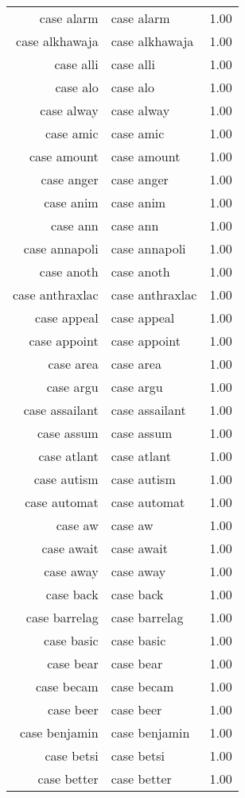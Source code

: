 \begin{table}[ht]
\begin{tabular}{rlr}
  case alarm & case alarm & 1.00 \\ 
  case alkhawaja & case alkhawaja & 1.00 \\ 
  case alli & case alli & 1.00 \\ 
  case alo & case alo & 1.00 \\ 
  case alway & case alway & 1.00 \\ 
  case amic & case amic & 1.00 \\ 
  case amount & case amount & 1.00 \\ 
  case anger & case anger & 1.00 \\ 
  case anim & case anim & 1.00 \\ 
  case ann & case ann & 1.00 \\ 
  case annapoli & case annapoli & 1.00 \\ 
  case anoth & case anoth & 1.00 \\ 
  case anthraxlac & case anthraxlac & 1.00 \\ 
  case appeal & case appeal & 1.00 \\ 
  case appoint & case appoint & 1.00 \\ 
  case area & case area & 1.00 \\ 
  case argu & case argu & 1.00 \\ 
  case assailant & case assailant & 1.00 \\ 
  case assum & case assum & 1.00 \\ 
  case atlant & case atlant & 1.00 \\ 
  case autism & case autism & 1.00 \\ 
  case automat & case automat & 1.00 \\ 
  case aw & case aw & 1.00 \\ 
  case await & case await & 1.00 \\ 
  case away & case away & 1.00 \\ 
  case back & case back & 1.00 \\ 
  case barrelag & case barrelag & 1.00 \\ 
  case basic & case basic & 1.00 \\ 
  case bear & case bear & 1.00 \\ 
  case becam & case becam & 1.00 \\ 
  case beer & case beer & 1.00 \\ 
  case benjamin & case benjamin & 1.00 \\ 
  case betsi & case betsi & 1.00 \\ 
  case better & case better & 1.00 \\ 

\end{tabular}
\end{table}
